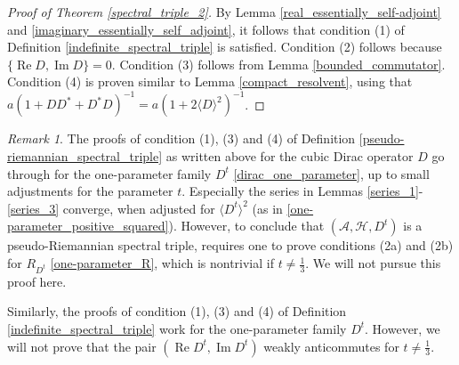 \documentclass{amsart}
\theoremstyle{definition}
\theoremstyle{remark}
\newtheorem{remark}[theorem]{Remark}
\DeclareMathOperator{\Ree}{Re}
\DeclareMathOperator{\Imm}{Im}
\numberwithin{equation}{section}
\begin{document}
\begin{proof}[Proof of Theorem \ref{spectral_triple_2}]
    By Lemma \ref{real_essentially_self-adjoint} and \ref{imaginary_essentially_self_adjoint}, it follows that condition (1) of Definition \ref{indefinite_spectral_triple} is satisfied. Condition (2) follows because $\{\Ree D,\Imm D\}=0$. Condition (3) follows from Lemma \ref{bounded_commutator}. Condition (4) is proven similar to Lemma \ref{compact_resolvent}, using that $a(1+DD^*+D^*D)^{-1}=a(1+2\langle D\rangle^2)^{-1}$. 
\end{proof}

\begin{remark}
    The proofs of condition (1), (3) and (4) of Definition \ref{pseudo-riemannian_spectral_triple} as written above for the cubic Dirac operator $D$ go through for the one-parameter family $D^t$ \eqref{dirac_one_parameter}, up to small adjustments for the parameter $t$. Especially the series in Lemmas \ref{series_1}-\ref{series_3} converge, when adjusted for $\langle D^t\rangle^2$ (as in \eqref{one-parameter_positive_squared}). However, to conclude that $(\mathcal{A},\mathcal{H},D^t)$ is a pseudo-Riemannian spectral triple, requires one to prove conditions (2a) and (2b) for $R_{D^t}$ \eqref{one-parameter_R}, which is nontrivial if $t\neq \tfrac{1}{3}$. We will not pursue this proof here.

    Similarly, the proofs of condition (1), (3) and (4) of Definition \ref{indefinite_spectral_triple} work for the one-parameter family $D^t$. However, we will not prove that the pair $(\Ree D^t,\Imm D^t)$ weakly anticommutes for $t\neq \tfrac{1}{3}$.
\end{remark}
\end{document}
